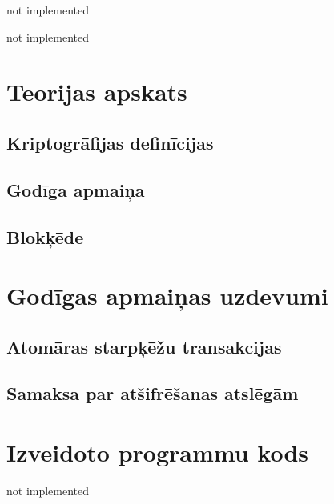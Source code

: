 \documentclass[singlespacing, latexmargins]{ludis}
\begin{document}
\maketitle

\begin{abstract-lv}
    not implemented

\end{abstract-lv}

\begin{abstract-en}
    not implemented

\end{abstract-en}

\tableofcontents





\chapter{Teorijas apskats}


\section{Kriptogrāfijas definīcijas}


\section{Godīga apmaiņa}


\section{Blokķēde}


\chapter{Godīgas apmaiņas uzdevumi}


\section{Atomāras starpķēžu transakcijas}


\section{Samaksa par atšifrēšanas atslēgām}









\appendix
\chapter{Izveidoto programmu kods}
not implemented
\end{document}
